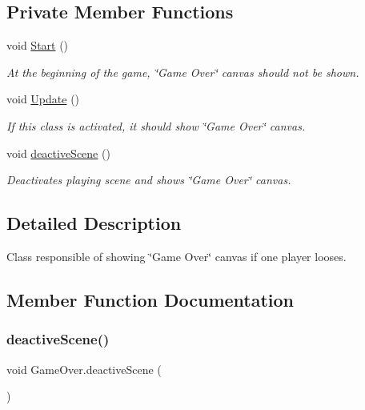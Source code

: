 \subsection*{Private Member Functions}
\begin{DoxyCompactItemize}
\item 
void \mbox{\hyperlink{class_game_over_a568be230765aad02fc07c3ff2d655e41}{Start}} ()
\begin{DoxyCompactList}\small\item\em At the beginning of the game, \char`\"{}\+Game Over\char`\"{} canvas should not be shown. \end{DoxyCompactList}\item 
void \mbox{\hyperlink{class_game_over_ab9acefb17781e10acace7ea576d48d63}{Update}} ()
\begin{DoxyCompactList}\small\item\em If this class is activated, it should show \char`\"{}\+Game Over\char`\"{} canvas. \end{DoxyCompactList}\item 
void \mbox{\hyperlink{class_game_over_a8dc8ae299906de6009ed0e7ae65b7ca9}{deactive\+Scene}} ()
\begin{DoxyCompactList}\small\item\em Deactivates playing scene and shows \char`\"{}\+Game Over\char`\"{} canvas. \end{DoxyCompactList}\end{DoxyCompactItemize}


\subsection{Detailed Description}
Class responsible of showing \char`\"{}\+Game Over\char`\"{} canvas if one player looses. 



\subsection{Member Function Documentation}
\mbox{\label{class_game_over_a8dc8ae299906de6009ed0e7ae65b7ca9}} 
\subsubsection{\texorpdfstring{deactive\+Scene()}{deactiveScene()}}
{\footnotesize\ttfamily void Game\+Over.\+deactive\+Scene (\begin{DoxyParamCaption}{ }\end{DoxyParamCaption})\hspace{0.3cm}{\ttfamily [private]}}



